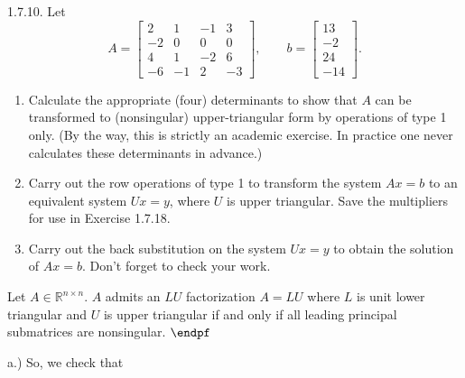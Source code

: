 \documentclass{report}
\begin{document}
    \begin{mdframed}
        1.7.10. Let 
        \[
            A = 
            \begin{bmatrix}
                2 & 1 & -1 & 3 \\
                -2 & 0 & 0 & 0 \\
                4 & 1 & -2 & 6 \\
                -6 & -1 & 2 & -3
            \end{bmatrix},
            \qquad
            b =
            \begin{bmatrix}
                13 \\
                -2 \\
                24 \\
                -14
            \end{bmatrix}.
        \]
        \begin{enumerate}[label=(\alph*)]
            \item Calculate the appropriate (four) determinants to show that $A$ can be transformed 
                to (nonsingular) upper-triangular form by operations of type 1 only. 
                (By the way, this is strictly an academic exercise. 
                In practice one never calculates these determinants in advance.)

            \item Carry out the row operations of type 1 to transform the system $Ax = b$ 
                to an equivalent system $Ux = y$, where $U$ is upper triangular. 
                Save the multipliers for use in Exercise 1.7.18.

            \item Carry out the back substitution on the system $Ux = y$ 
                to obtain the solution of $Ax = b$. 
                Don’t forget to check your work.
        \end{enumerate}
    \end{mdframed}
    \bigbreak \noindent 
    \begin{remark}
        Let $A \in \mathbb{R}^{n\times n}$. $A$ admits an $LU$ factorization $A = LU$ where $L$ is unit lower triangular and $U$ is upper triangular if and only if all leading principal submatrices are nonsingular. $\endpf $
    \end{remark}
    \bigbreak \noindent 
    a.) So, we check that
\end{document}
